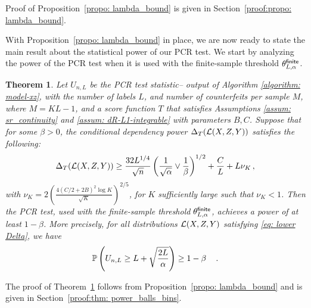 \documentclass[11pt]{article}
\newtheorem{thm}[propo]{Theorem}
\newcommand{\indep}{\perp \!\!\! \perp}
\begin{document}
Proof of Proposition~\ref{propo: lambda_bound} is given in Section~\ref{proof:propo: lambda_bound}.

With Proposition~\ref{propo: lambda_bound} in place, we are now ready to state the main result about the statistical power of our PCR test. We start by analyzing the power of the PCR test when it is used with the finite-sample threshold $\theta^{\mathsf {finite}}_{L,\alpha}$.

\begin{thm}\label{thm: power_balls_bins}
Let $U_{n,L}$ be the PCR test statistic-- output of Algorithm \ref{algorithm: model-xz}, with the number of labels $L$, and number of counterfeits per sample $M$, where $M= KL-1$, and a score function $T$ that satisfies Assumptions  \ref{assum: sr_continuity} and \ref{assum: dR-L1-integrable} with parameters $B,C$.  
Suppose that for some $\beta>0$, the conditional dependency power $\Delta_T(\mathcal{L}(X,Z,Y))$ satisfies the following:
 \begin{equation}\label{eq: lower Delta}
\Delta_{T}(\mathcal{L}(X,Z,Y)) \geq \frac{32{L}^{1/4}}{\sqrt{n}}\left( \frac{1}{\sqrt{\alpha}} \vee \frac{1}{\beta} \right)^{1/2} + \frac{C}{L}+L \nu_K \,,
\end{equation}
with $\nu_K=2\left(\frac{4(C/2+2B)^2\log{K}}{\sqrt{K}}  \right)^{2/5}$, for $K$ sufficiently large such that $\nu_K<1$. Then the PCR test, used with the finite-sample threshold
$\theta^{\mathsf{finite}}_{L,\alpha}$, achieves a power of at least $1-\beta$. More precisely, for all distributions $\mathcal{L}(X,Z,Y)$ satisfying \eqref{eq: lower Delta}, we have 
%
\[
{\mathbb P}\left(U_{n,L} \geq L+\sqrt{\frac{2L}{\alpha}} \right) \geq 1-\beta\quad\,.
\]
\end{thm}
The proof of Theorem~\ref{thm: power_balls_bins} follows from Proposition~\ref{propo: lambda_bound}  and is given in Section~\ref{proof:thm: power_balls_bins}.
 
\end{document}
